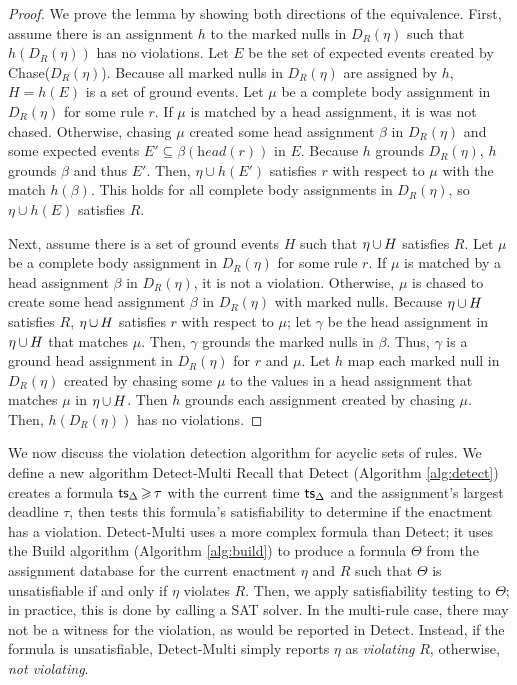 \begin{proof}
We prove the lemma by showing both directions of the equivalence.
First,
assume there is an assignment $h$ to the marked nulls in $D_{R}(\eta)$
such that $h(D_{R}(\eta))$ has no violations.
Let $E$ be the set of expected events created by {\sf Chase}($D_{R}(\eta)$).
Because all marked nulls in $D_{R}(\eta)$ are assigned by $h$,
$H=h(E)$ is a set of ground events.
Let $\mu$ be a complete body assignment in $D_{R}(\eta)$ for some rule $r$.
If $\mu$ is matched by a head assignment,
it is was not chased.
Otherwise,
chasing $\mu$ created some head assignment $\beta$ in $D_{R}(\eta)$
and some expected events $E'\subseteq \beta(\textit{head}(r))$ in $E$.
Because $h$ grounds $D_{R}(\eta)$,
$h$ grounds $\beta$ and thus $E'$.
Then, $\eta\cup h(E')$ satisfies $r$ with respect to $\mu$
with the match $h(\beta)$.
This holds for all complete body assignments in $D_{R}(\eta)$,
so $\eta\cup h(E)$ satisfies $R$.

Next,
assume there is a set of ground events $H$
such that $\eta\,{\cup}\, H$ satisfies $R$.
Let $\mu$ be a complete body assignment in $D_{R}(\eta)$ for some rule $r$.
If $\mu$ is matched by a head assignment $\beta$ in $D_{R}(\eta)$,
it is not a violation.
Otherwise,
$\mu$ is chased to create some head assignment $\beta$ in $D_{R}(\eta)$
with marked nulls.
Because $\eta\,{\cup}\, H$ satisfies $R$,
$\eta\,{\cup}\, H$ satisfies $r$ with respect to $\mu$;
let $\gamma$ be the head assignment in $\eta\,{\cup}\, H$ that matches $\mu$.
Then, $\gamma$ grounds the marked nulls in $\beta$.
Thus, $\gamma$ is a ground head assignment in $D_{R}(\eta)$ for $r$ and $\mu$.
Let $h$ map each marked null in $D_{R}(\eta)$ created by chasing some $\mu$
to the values in a head assignment that matches $\mu$ in $\eta\,{\cup}\, H$.
Then $h$ grounds each assignment created by chasing $\mu$.
Then, $h(D_{R}(\eta))$ has no violations.
\end{proof}

We now discuss the violation detection algorithm
for acyclic sets of rules.
We define a new algorithm {\sf Detect-Multi}
Recall that {\sf Detect} (Algorithm \ref{alg:detect})
creates a formula $\textsf{ts}_\Delta\,{\geqslant}\, \tau$
with the current time $\textsf{ts}_\Delta$ and the assignment's largest deadline $\tau$,
then tests this formula's satisfiability
to determine if the enactment has a violation.
{\sf Detect-Multi} uses a more complex formula than {\sf Detect};
it uses the {\sf Build} algorithm (Algorithm \ref{alg:build})
to produce a formula $\Theta$ from the assignment database
for the current enactment $\eta$ and $R$
such that $\Theta$ is unsatisfiable if and only if $\eta$ violates $R$.
Then, we apply satisfiability testing to $\Theta$;
in practice, this is done by calling a SAT solver.
In the multi-rule case,
there may not be a witness for the violation,
as would be reported in {\sf Detect}.
Instead,
if the formula is unsatisfiable,
{\sf Detect-Multi} simply reports $\eta$ as {\em violating} $R$,
otherwise, {\em not violating}.

